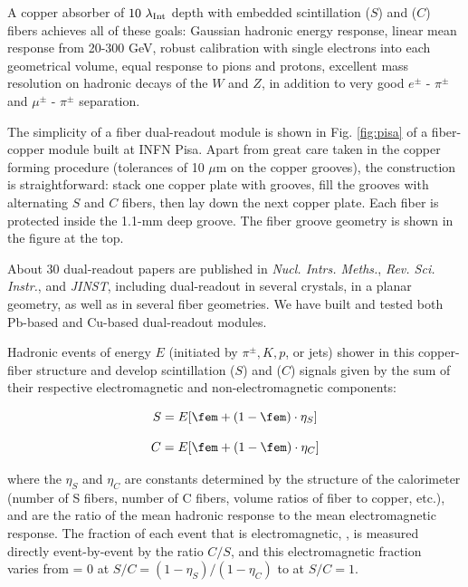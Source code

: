  
 A copper absorber of $10 ~\lambda_{\rm Int}$ depth with embedded scintillation ($S$) and \C ($C$) fibers achieves
 all of these goals:  Gaussian hadronic energy response,  linear mean response from 20-300 GeV, 
  robust calibration with single electrons into each geometrical volume, 
  equal response to pions and protons, 
  excellent mass resolution on hadronic decays of the $W$ and $Z$,
  in addition to very good $e^{\pm}$ -  $\pi^{\pm}$  and  $\mu^{\pm}$ -  $\pi^{\pm}$ separation.  
 
 
 
 The simplicity of a fiber dual-readout module is shown in Fig. \ref{fig:pisa} of a fiber-copper module built at INFN Pisa.  
 Apart from great care taken in the copper forming procedure (tolerances of 10 $\mu$m on the copper grooves), the 
 construction is straightforward:  stack one copper plate with grooves, fill the grooves with alternating $S$ and $C$ fibers,
 then lay down the next copper plate.  Each fiber is protected inside the 1.1-mm deep groove.   The fiber groove geometry
 is shown in the figure at the top.   
 
About 30 dual-readout papers are published in {\it Nucl. Intrs. Meths.}, {\it Rev. Sci. Instr.}, and {\it JINST}, including
dual-readout in several crystals, in a planar geometry, as well as in several fiber geometries. We have built
and tested both Pb-based and Cu-based dual-readout modules.   



Hadronic events of energy $E$ (initiated by $\pi^{\pm}, K, p$, or jets) shower in this copper-fiber structure and develop scintillation ($S$) and 
\C ($C$) signals given by the sum of their respective electromagnetic and non-electromagnetic components:

\begin{displaymath}
  S = E [ \fem + (1 - \fem) \cdot \eta_S ]
\end{displaymath}

\begin{displaymath}
  C = E [ \fem + (1 - \fem) \cdot \eta_C ]
\end{displaymath}

\noindent where the $\eta_S$ and $\eta_C$ are constants determined by the structure of the calorimeter (number of S fibers, number of C fibers, volume ratios of fiber to copper, etc.), and are the ratio of the mean hadronic response to the mean electromagnetic response.  The fraction of each event that is electromagnetic, \fem, is measured directly event-by-event by the ratio $C/S$, and this electromagnetic fraction \fem ~ varies from \fem = 0 at $S/C = (1-\eta_S)/(1-\eta_C)$ to  at $S/C=1$.

